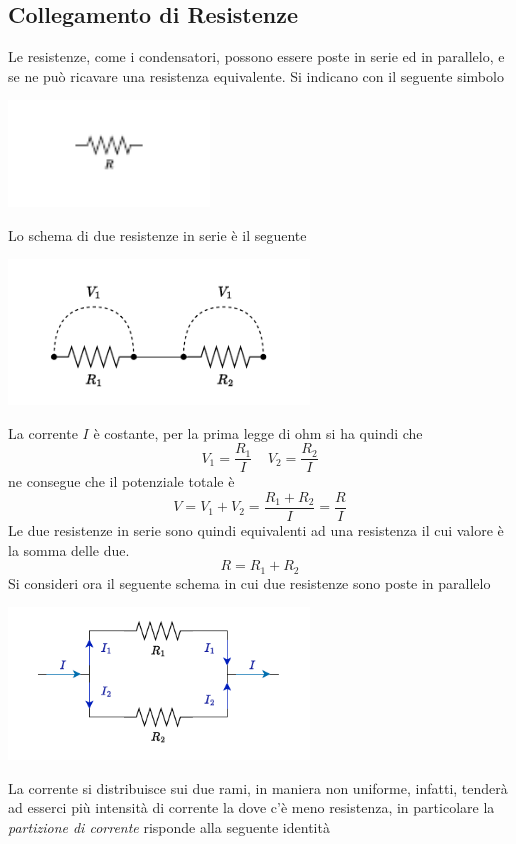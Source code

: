 \documentclass[10pt, letterpaper]{report}
\begin{document}
\subsection{Collegamento di Resistenze}
Le resistenze, come i condensatori, possono essere poste in serie ed in parallelo, e se ne può ricavare una resistenza equivalente. Si indicano con il seguente simbolo\begin{center}
    \includegraphics[width=0.4\textwidth]{images/resistenza.pdf}
\end{center}
Lo schema di due resistenze in serie è il seguente 
\begin{center}
    \includegraphics[width=0.6\textwidth]{images/resistenzaSerie.pdf}
\end{center} 
La corrente $I$ è costante, per la prima legge di ohm si ha quindi che 
$$ V_1=\frac{R_1}{I} \ \ \ \ \ V_2=\frac{R_2}{I}$$
ne consegue che il potenziale totale è 
$$ V=V_1+V_2=\frac{R_1+R_2}{I}=\frac{R}{I}$$
Le due resistenze in serie sono quindi equivalenti ad una resistenza il cui valore è la somma delle due. 
$$ R=R_1+R_2$$
Si consideri ora il seguente schema in cui due resistenze sono poste in parallelo\begin{center}
    \includegraphics[width=0.6\textwidth]{images/resistenzeParallelo.pdf}
\end{center}
La corrente si distribuisce sui due rami, in maniera non uniforme, infatti, tenderà ad esserci più intensità di corrente la dove c'è meno resistenza, in particolare la \textit{partizione di corrente} risponde alla seguente identità
\end{document}
